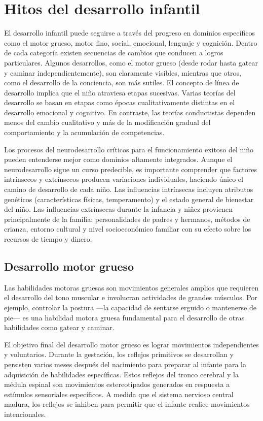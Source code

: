 \documentclass[11pt,letterpaper]{report}
\begin{document}
\section{Hitos del desarrollo infantil}
El desarrollo infantil puede seguirse a través del progreso en dominios
específicos como el motor grueso, motor fino, social, emocional, lenguaje y
cognición. Dentro de cada categoría existen secuencias de cambios que conducen
a logros particulares. Algunos desarrollos, como el motor grueso (desde rodar
hasta gatear y caminar independientemente), son claramente visibles, mientras
que otros, como el desarrollo de la conciencia, son más sutiles. El concepto de
línea de desarrollo implica que el niño atraviesa etapas sucesivas. Varias
teorías del desarrollo se basan en etapas como épocas cualitativamente
distintas en el desarrollo emocional y cognitivo. En contraste, las teorías
conductistas dependen menos del cambio cualitativo y más de la modificación
gradual del comportamiento y la acumulación de competencias.
\cite{Nelson19}

Los procesos del neurodesarrollo críticos para el funcionamiento exitoso del
niño pueden entenderse mejor como dominios altamente integrados. Aunque el
neurodesarrollo sigue un curso predecible, es importante comprender que
factores intrínsecos y extrínsecos producen variaciones individuales, haciendo
único el camino de desarrollo de cada niño. Las influencias intrínsecas
incluyen atributos genéticos (características físicas, temperamento) y el
estado general de bienestar del niño. Las influencias extrínsecas durante la
infancia y niñez provienen principalmente de la familia: personalidades de
padres y hermanos, métodos de crianza, entorno cultural y nivel
socioeconómico familiar con su efecto sobre los recursos de tiempo y dinero.
\cite{Gerber2010}

\subsection{Desarrollo motor grueso}
Las habilidades motoras gruesas son movimientos generales amplios que requieren
el desarrollo del tono muscular e involucran actividades de grandes músculos.
Por ejemplo, controlar la postura —la capacidad de sentarse erguido o
mantenerse de pie— es una habilidad motora gruesa fundamental para el
desarrollo de otras habilidades como gatear y caminar. \cite{Lorentz2021}

El objetivo final del desarrollo motor grueso es lograr movimientos
independientes y voluntarios. Durante la gestación, los reflejos primitivos se
desarrollan y persisten varios meses después del nacimiento para preparar al
infante para la adquisición de habilidades específicas. Estos reflejos del
tronco cerebral y la médula espinal son movimientos estereotipados generados en
respuesta a estímulos sensoriales específicos. A medida que el sistema nervioso
central madura, los reflejos se inhiben para permitir que el infante realice
movimientos intencionales. \cite{Gerber2010}
\end{document}
